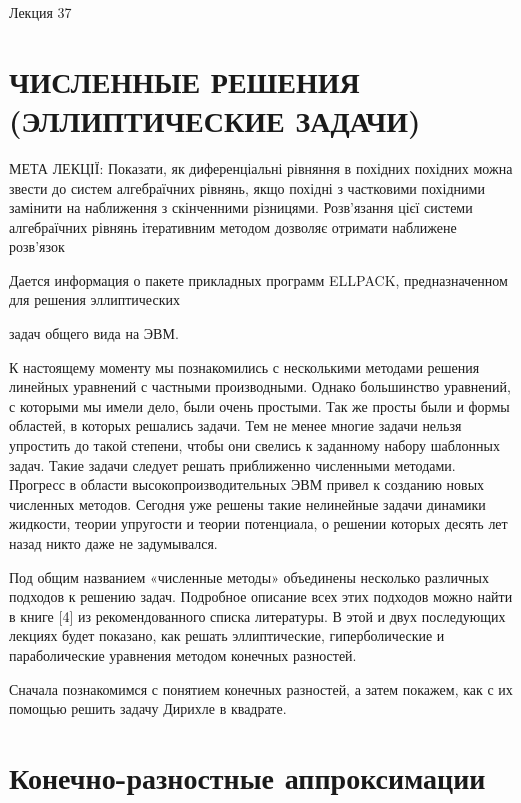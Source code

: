 \documentclass[
  ukrainian,
]{article}
\begin{document}
Лекция 37

\section{ЧИСЛЕННЫЕ РЕШЕНИЯ (ЭЛЛИПТИЧЕСКИЕ
ЗАДАЧИ)}\label{ux447ux438ux441ux43bux435ux43dux43dux44bux435-ux440ux435ux448ux435ux43dux438ux44f-ux44dux43bux43bux438ux43fux442ux438ux447ux435ux441ux43aux438ux435-ux437ux430ux434ux430ux447ux438}

МЕТА ЛЕКЦІЇ: Показати, як диференціальні рівняння в похідних похідних
можна звести до систем алгебраїчних рівнянь, якщо похідні з частковими
похідними замінити на наближення з скінченними різницями. Розв'язання
цієї системи алгебраїчних рівнянь ітеративним методом дозволяє отримати
наближене розв'язок

Дается информация о пакете прикладных программ ELLPACK, предназначенном
для решения эллиптических

задач общего вида на ЭВМ.

К настоящему моменту мы познакомились с несколькими методами решения
линейных уравнений с частными производными. Однако большинство
уравнений, с которыми мы имели дело, были очень простыми. Так же просты
были и формы областей, в которых решались задачи. Тем не менее многие
задачи нельзя упростить до такой степени, чтобы они свелись к заданному
набору шаблонных задач. Такие задачи следует решать приближенно
численными методами. Прогресс в области высокопроизводительных ЭВМ
привел к созданию новых численных методов. Сегодня уже решены такие
нелинейные задачи динамики жидкости, теории упругости и теории
потенциала, о решении которых десять лет назад никто даже не
задумывался.

Под общим названием «численные методы» объединены несколько различных
подходов к решению задач. Подробное описание всех этих подходов можно
найти в книге {[}4{]} из рекомендованного списка литературы. В этой и
двух последующих лекциях будет показано, как решать эллиптические,
гиперболические и параболические уравнения методом конечных разностей.

Сначала познакомимся с понятием конечных разностей, а затем покажем, как
с их помощью решить задачу Дирихле в квадрате.

\section{Конечно-разностные
аппроксимации}\label{ux43aux43eux43dux435ux447ux43dux43e-ux440ux430ux437ux43dux43eux441ux442ux43dux44bux435-ux430ux43fux43fux440ux43eux43aux441ux438ux43cux430ux446ux438ux438}
\end{document}
